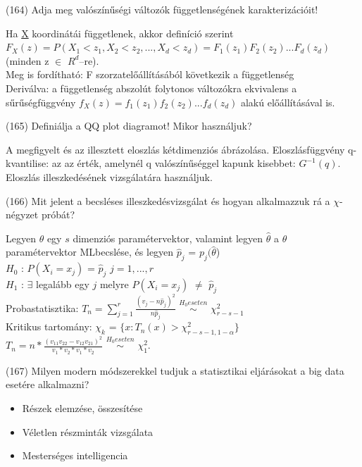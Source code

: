 \documentclass[12p]{article}
\begin{document}
(164) Adja meg valószínűségi változók függetlenségének karakterizációit!

Ha \underline{X} koordinátái függetlenek, akkor definíció szerint\\
$F_X(z)=P(X_1<z_1, X_2< z_2,..., X_d<z_d)=F_1(z_1)F_2(z_2)...F_d(z_d)$ (minden z $\in$ $R^d$–re).\\
Meg is fordítható: F szorzatelőállításából következik a függetlenség\\
Deriválva: a függetlenség abszolút folytonos változókra ekvivalens a sűrűségfüggvény 
$f_X(z)=f_1(z_1)f_2(z_2)...f_d(z_d)$ alakú előállításával is.

(165) Definiálja a QQ plot diagramot! Mikor használjuk?

A megfigyelt és az illesztett eloszlás kétdimenziós ábrázolása. Eloszlásfüggvény q-kvantilise: az az érték, amelynél q valószínűséggel kapunk kisebbet: $G^{-1}(q)$.\\
Eloszlás illeszkedésének vizsgálatára használjuk.

(166) Mit jelent a becsléses illeszkedésvizsgálat és hogyan alkalmazzuk rá a $\chi$-négyzet próbát?

Legyen $\theta$ egy $s$ dimenziós paramétervektor, valamint legyen $\hat{\theta}$ a $\theta$ paramétervektor MLbecslése, és legyen $\hat{p}_j$ = $p_j (\hat{\theta}$)\\
$H_0$ : $P(X_i = x_j)$ = $\hat{p}_j$ $j = 1,. . . , r$\\
$H_1$ : $\exists$ legalább egy $j$ melyre $P(X_i = x_j)$ $\neq$ $\hat{p}_j$\\
Probastatisztika: $T_n = \displaystyle{\sum_{j=1}^{r}}\frac{(v_j - n\hat{p}_j)^2}{n\hat{p}_j}$ $\stackrel{H_0 eseten}{\sim}$ $\chi^2_{r-s-1}$\\
Kritikus tartomány: $\chi_k$ = $\{x: T_n(x) > \chi^2_{r-s-1,1-\alpha}\}$\\
$T_n = n * \frac{(v_{11}v_{22} - v_{12}v_{21})^2}{v_1 * v_2 * v_1 * v_2}$ $\stackrel{H_0 eseten}{\sim}$ $\chi^2_1$.



(167) Milyen modern módszerekkel tudjuk a statisztikai eljárásokat a big data esetére alkalmazni?

\begin{itemize}
\item Részek elemzése, összesítése
\item Véletlen részminták vizsgálata
\item Mesterséges intelligencia
\end{itemize}
\end{document}
